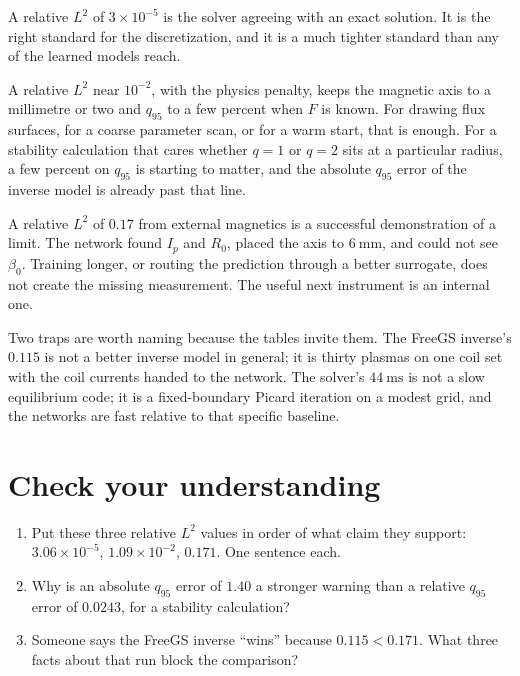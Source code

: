 \documentclass[11pt,a4paper,oneside,openany]{book}
\numberwithin{equation}{chapter}
\newcommand{\Ip}{I_{p}}
\theoremstyle{definition}
\begin{document}
A relative \(L^{2}\) of \(3\times 10^{-5}\) is the solver agreeing with an exact solution. It is the right standard for the discretization, and it is a much tighter standard than any of the learned models reach.

A relative \(L^{2}\) near \(10^{-2}\), with the physics penalty, keeps the magnetic axis to a millimetre or two and \(q_{95}\) to a few percent when \(F\) is known. For drawing flux surfaces, for a coarse parameter scan, or for a warm start, that is enough. For a stability calculation that cares whether \(q=1\) or \(q=2\) sits at a particular radius, a few percent on \(q_{95}\) is starting to matter, and the absolute \(q_{95}\) error of the inverse model is already past that line.

A relative \(L^{2}\) of \(0.17\) from external magnetics is a successful demonstration of a limit. The network found \(\Ip\) and \(R_{0}\), placed the axis to \(\qty{6}{\milli\metre}\), and could not see \(\beta_{0}\). Training longer, or routing the prediction through a better surrogate, does not create the missing measurement. The useful next instrument is an internal one.

Two traps are worth naming because the tables invite them. The FreeGS inverse's \(0.115\) is not a better inverse model in general; it is thirty plasmas on one coil set with the coil currents handed to the network. The solver's \(\qty{44}{\milli\second}\) is not a slow equilibrium code; it is a fixed-boundary Picard iteration on a modest grid, and the networks are fast relative to that specific baseline.

\section*{Check your understanding}
\begin{enumerate}[label=\textbf{Q14.\arabic*.},leftmargin=2.6em]
\item Put these three relative \(L^{2}\) values in order of what claim they support: \(3.06\times 10^{-5}\), \(1.09\times 10^{-2}\), \(0.171\). One sentence each.
\item Why is an absolute \(q_{95}\) error of \(1.40\) a stronger warning than a relative \(q_{95}\) error of \(0.0243\), for a stability calculation?
\item Someone says the FreeGS inverse ``wins'' because \(0.115<0.171\). What three facts about that run block the comparison?
\end{enumerate}
\end{document}
